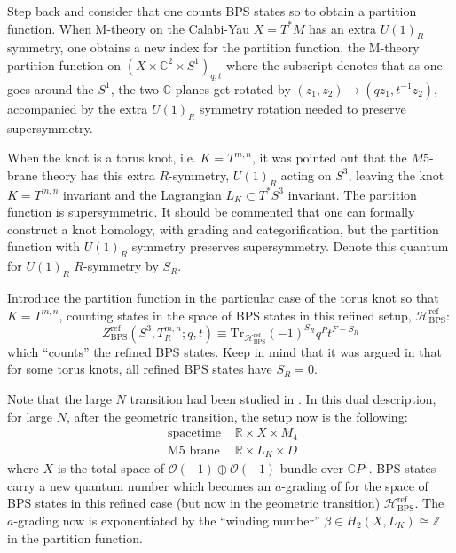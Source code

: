 \documentclass[a4paper,titlepage,twoside]{book}
\begin{document}
Step back and consider that one counts BPS states so to obtain a partition function.  When M-theory on the Calabi-Yau $X= T^*M$ has an extra $U(1)_R$ symmetry, one obtains a new index for the partition function, the M-theory partition function on $(X \times \mathbb{C}^2 \times S^1)_{q,t}$ where the subscript denotes that as one goes around the $S^1$, the two $\mathbb{C}$ planes get rotated by $(z_1, z_2 ) \to (qz_1, t^{-1}z_2)$, accompanied by the extra $U(1)_R$ symmetry rotation needed to preserve supersymmetry.

When the knot is a torus knot, i.e. $K=T^{m,n}$, it was pointed out \cite{AganagicShakirov2012} that the $M5$-brane theory has this extra $R$-symmetry, $U(1)_R$ acting on $S^3$, leaving the knot $K=T^{m,n}$ invariant and the Lagrangian $L_K \subset T^*S^3$ invariant.  The partition function is supersymmetric.  It should be commented that one can formally construct a knot homology, with grading and categorification, but the partition function with $U(1)_R$ symmetry preserves supersymmetry.  Denote this quantum for $U(1)_R$ $R$-symmetry by $S_R$.  

Introduce the partition function in the particular case of the torus knot so that $K = T^{m,n}$, counting states in the space of BPS states in this refined setup, $\mathcal{H}^{\text{ref}}_{\text{BPS}}$:
\begin{equation}
Z^{\text{ref}}_{\text{BPS}}(S^3, T^{m,n}_R;q,t)  \equiv \text{Tr}_{\mathcal{H}^{\text{ref}}_{\text{BPS}}   }{  (-1)^{S_R} q^{P} t^{F-S_R} }
\end{equation}
which ``counts'' the refined BPS states.  Keep in mind that it was argued in \cite{AganagicShakirov2012} that for some torus knots, all refined BPS states have $S_R =0$.


Note that the large $N$ transition had been studied in \cite{bib:OV2000}. In this dual description, for large $N$, after the geometric transition, the setup now is the following:
\begin{equation}
  \begin{aligned}
 \text{ spacetime }  & \mathbb{R} \times X \times M_4 \\ 
\text{ M5 brane }    & \mathbb{R} \times L_K \times D
\end{aligned}
\end{equation}
where $X$ is the total space of $\mathcal{O}{(-1)} \oplus \mathcal{O}{ (-1)}$ bundle over $\mathbb{C}P^1$.  BPS states carry a new quantum number which becomes an $a$-grading of for the space of BPS states in this refined case (but now in the geometric transition) $\mathcal{H}^{\text{ref}}_{\text{BPS}}$.  The $a$-grading now is exponentiated by the ``winding number'' $\beta \in H_2(X,L_K) \cong \mathbb{Z}$ in the partition function.  
\end{document}
